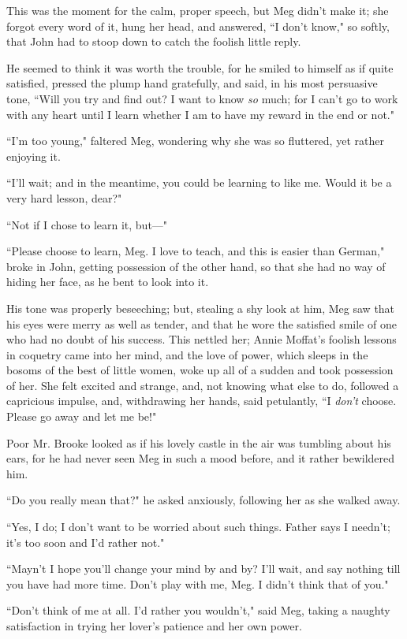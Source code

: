 This was the moment for the calm, proper speech, but Meg
didn't make it; she forgot every word of it, hung her
head, and answered, ``I don't know," so softly, that John
had to stoop down to catch the foolish little reply.

He seemed to think it was worth the trouble, for he smiled to himself as
if quite satisfied, pressed the plump hand gratefully, and said, in his
most persuasive tone, ``Will you try and find out? I want to know
\emph{so} much; for I can't go to work with any heart
until I learn whether I am to have my reward in the end or not."

``I'm too young," faltered Meg, wondering why she was so
fluttered, yet rather enjoying it.

``I'll wait; and in the meantime, you could be learning
to like me. Would it be a very hard lesson, dear?"

``Not if I chose to learn it, but---"

``Please choose to learn, Meg. I love to teach, and this is easier than
German," broke in John, getting possession of the other hand, so that
she had no way of hiding her face, as he bent to look into it.

His tone was properly beseeching; but, stealing a shy look at him, Meg
saw that his eyes were merry as well as tender, and that he wore the
satisfied smile of one who had no doubt of his success. This nettled
her; Annie Moffat's foolish lessons in coquetry came
into her mind, and the love of power, which sleeps in the bosoms of the
best of little women, woke up all of a sudden and took possession of
her. She felt excited and strange, and, not knowing what else to do,
followed a capricious impulse, and, withdrawing her hands, said
petulantly, ``I \emph{don't} choose. Please go away and
let me be!"

Poor Mr. Brooke looked as if his lovely castle in the air was tumbling
about his ears, for he had never seen Meg in such a mood before, and it
rather bewildered him.

``Do you really mean that?" he asked anxiously, following her as she
walked away.

``Yes, I do; I don't want to be worried about such
things. Father says I needn't; it's too
soon and I'd rather not."

``Mayn't I hope you'll change your mind
by and by? I'll wait, and say nothing till you have had
more time. Don't play with me, Meg. I
didn't think that of you."

``Don't think of me at all. I'd rather
you wouldn't," said Meg, taking a naughty satisfaction
in trying her lover's patience and her own power.

